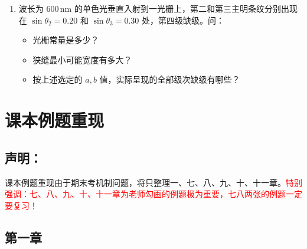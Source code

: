 \begin{enumerate}
	\vspace{0.5em}
	
	\item [\textbf{11-47}] 波长为 $600\,\mathrm{nm}$ 的单色光垂直入射到一光栅上，第二和第三主明条纹分别出现在 $\sin\theta_2=0.20$ 和 $\sin\theta_3=0.30$ 处，第四级缺级。问：
	\begin{itemize}
		\item [(1)] 光栅常量是多少？
		\item [(2)] 狭缝最小可能宽度有多大？
		\item [(3)] 按上述选定的 $a,b$ 值，实际呈现的全部级次缺级有哪些？
	\end{itemize}
	
\end{enumerate}

\newpage

\section{课本例题重现}

\subsection*{声明：}

课本例题重现由于期末考机制问题，将只整理一、七、八、九、十、十一章。\textcolor{red}{特别强调：七、八、九、十、十一章为老师勾画的例题极为重要，七八两张的例题一定要复习！}

\subsection{第一章}

